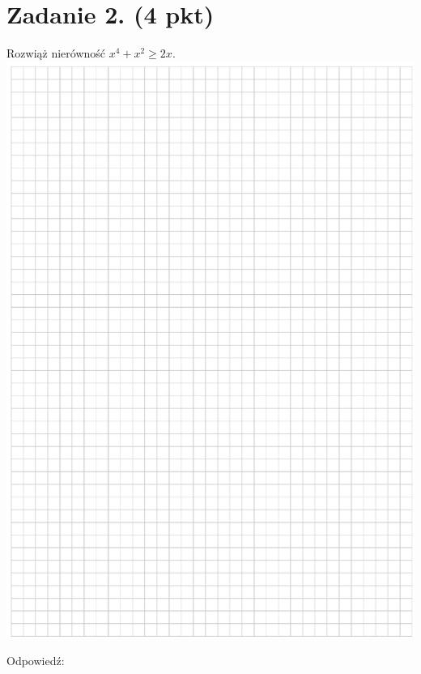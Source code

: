 \documentclass[10pt]{article}
\begin{document}
\section*{Zadanie 2. (4 pkt)}
Rozwiąż nierówność \(x^{4}+x^{2} \geq 2 x\).\\
\includegraphics[max width=\textwidth, center]{2024_11_21_606d6e4e152fe3e9f6feg-04}

Odpowiedź:
\end{document}
